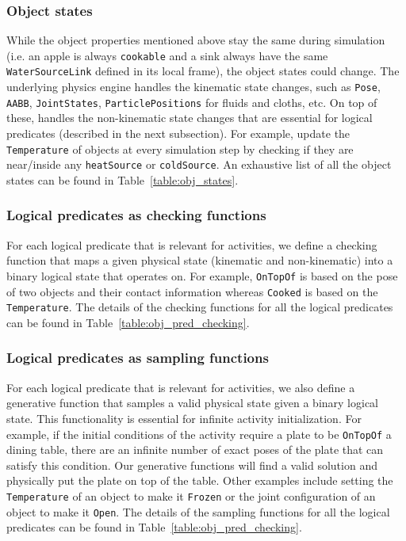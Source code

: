 \subsubsection{Object states}
While the object properties mentioned above stay the same during simulation (i.e. an apple is always \texttt{cookable} and a sink always have the same \texttt{WaterSourceLink} defined in its local frame), the object states could change. The underlying physics engine handles the kinematic state changes, such as \texttt{Pose}, \texttt{AABB}, \texttt{JointStates}, \texttt{ParticlePositions} for fluids and cloths, etc. On top of these, \simulator handles the non-kinematic state changes that are essential for logical predicates (described in the next subsection). For example, \simulator update the \texttt{Temperature} of objects at every simulation step by checking if they are near/inside any \texttt{heatSource} or \texttt{coldSource}. An exhaustive list of all the object states can be found in Table~\ref{table:obj_states}.


\subsubsection{Logical predicates as checking functions}
For each logical predicate that is relevant for \benchmark activities, we define a checking function that maps a given physical state (kinematic and non-kinematic) into a binary logical state that \bddl operates on. For example, \texttt{OnTopOf} is based on the pose of two objects and their contact information whereas \texttt{Cooked} is based on the \texttt{Temperature}. The details of the checking functions for all the logical predicates can be found in Table~\ref{table:obj_pred_checking}.



\subsubsection{Logical predicates as sampling functions}
For each logical predicate that is relevant for \benchmark activities, we also define a generative function that samples a valid physical state given a binary logical state. This functionality is essential for infinite activity initialization. For example, if the initial conditions of the activity require a plate to be \texttt{OnTopOf} a dining table, there are an infinite number of exact poses of the plate that can satisfy this condition. Our generative functions will find a valid solution and physically put the plate on top of the table. Other examples include setting the \texttt{Temperature} of an object to make it \texttt{Frozen} or the joint configuration of an object to make it \texttt{Open}. The details of the sampling functions for all the logical predicates can be found in Table~\ref{table:obj_pred_checking}.

